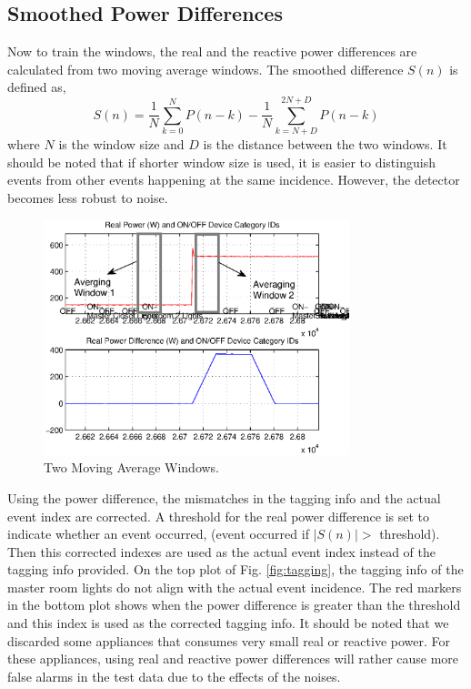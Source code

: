 \documentclass[conference]{IEEEtran}
\begin{document}
	\subsection{Smoothed Power Differences}
	Now to train the windows, the real and the reactive power differences are calculated from two moving average windows.  The smoothed difference $S(n)$ is defined as,
	\begin{equation}
		S(n) = \frac{1}{N}\sum_{k=0}^{N}P(n-k) - \frac{1}{N}\sum_{k=N+D}^{2N+D}P(n-k)
	\end{equation}
	where $N$ is the window size and $D$ is the distance between the two windows. 
	It should be noted that if shorter window size is used, it is easier to distinguish events from other events happening at the same incidence.  However, the detector becomes less robust to noise.
	
	\begin{figure}[!t]
		\centering
		\includegraphics[width=3.5in]{fig/maw.eps}
		\caption{Two Moving Average Windows.}
		\label{fig:maw}
	\end{figure}
	
	Using the power difference,  the mismatches in the tagging info and the actual event index are corrected.  A threshold for the real power difference is set to indicate whether an event occurred, (event occurred if $|S(n)| >$ threshold).  Then this corrected indexes are used as the actual event index instead of the tagging info provided.  On the top plot of Fig. \ref{fig:tagging}, the tagging info of the master room lights do not align with the actual event incidence.  The red markers in the bottom plot shows when the power difference is greater than the threshold and this index is used as the corrected tagging info.  It should be noted that we discarded some appliances that consumes very small real or reactive power.  For these appliances, using real and reactive power differences will rather cause more false alarms in the test data due to the effects of the noises. 
	
\end{document}

